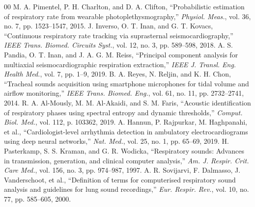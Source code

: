 \documentclass[journal]{IEEEtran}
\begin{document}
\begin{thebibliography}{00}
 M. A. Pimentel, P. H. Charlton, and D. A. Clifton, ``Probabilistic estimation of respiratory rate from wearable photoplethysmography,'' \textit{Physiol. Meas.}, vol. 36, no. 7, pp. 1523--1547, 2015.
 J. Inverso, O. T. Inan, and G. T. Kovacs, ``Continuous respiratory rate tracking via suprasternal seismocardiography,'' \textit{IEEE Trans. Biomed. Circuits Syst.}, vol. 12, no. 3, pp. 589--598, 2018.
 A. S. Pandia, O. T. Inan, and J. A. G. M. Reiss, ``Principal component analysis for multiaxial seismocardiographic respiration extraction,'' \textit{IEEE J. Transl. Eng. Health Med.}, vol. 7, pp. 1--9, 2019.
 B. A. Reyes, N. Reljin, and K. H. Chon, ``Tracheal sounds acquisition using smartphone microphones for tidal volume and airflow monitoring,'' \textit{IEEE Trans. Biomed. Eng.}, vol. 61, no. 11, pp. 2732--2741, 2014.
 R. A. Al-Mously, M. M. Al-Akaidi, and S. M. Faris, ``Acoustic identification of respiratory phases using spectral entropy and dynamic thresholds,'' \textit{Comput. Biol. Med.}, vol. 112, p. 103362, 2019.
 A. Hannun, P. Rajpurkar, M. Haghpanahi, et al., ``Cardiologist-level arrhythmia detection in ambulatory electrocardiograms using deep neural networks,'' \textit{Nat. Med.}, vol. 25, no. 1, pp. 65--69, 2019.
 H. Pasterkamp, S. S. Kraman, and G. R. Wodicka, ``Respiratory sounds: Advances in transmission, generation, and clinical computer analysis,'' \textit{Am. J. Respir. Crit. Care Med.}, vol. 156, no. 3, pp. 974--987, 1997.
 A. R. Sovijarvi, F. Dalmasso, J. Vanderschoot, et al., ``Definition of terms for computerised respiratory sound analysis and guidelines for lung sound recordings,'' \textit{Eur. Respir. Rev.}, vol. 10, no. 77, pp. 585--605, 2000.
\end{thebibliography}
\end{document}
